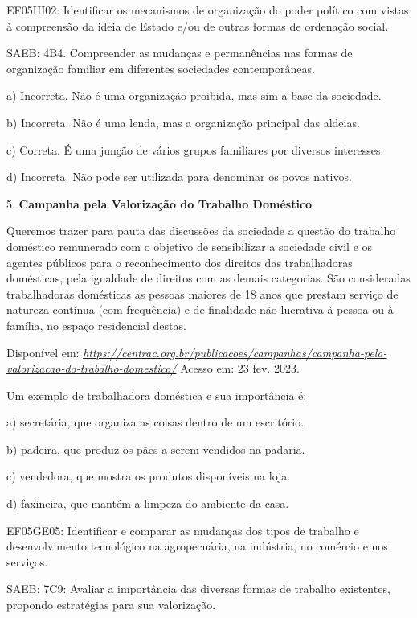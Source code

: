 EF05HI02: Identificar os mecanismos de organização do poder político com
vistas à compreensão da ideia de Estado e/ou de outras formas de
ordenação social.

SAEB: 4B4. Compreender as mudanças e permanências nas formas de
organização familiar em diferentes sociedades contemporâneas.

a) Incorreta. Não é uma organização proibida, mas sim a base da
sociedade.

b) Incorreta. Não é uma lenda, mas a organização principal das aldeias.

c) Correta. É uma junção de vários grupos familiares por diversos
interesses.

d) Incorreta. Não pode ser utilizada para denominar os povos nativos.

5. \textbf{Campanha pela Valorização do Trabalho Doméstico}

Queremos trazer para pauta das discussões da sociedade a questão do
trabalho doméstico remunerado com o objetivo de sensibilizar a sociedade
civil e os agentes públicos para o reconhecimento dos direitos das
trabalhadoras domésticas, pela igualdade de direitos com as demais
categorias. São consideradas trabalhadoras domésticas as pessoas maiores
de 18 anos que prestam serviço de natureza contínua (com frequência) e
de finalidade não lucrativa à pessoa ou à família, no espaço residencial
destas.

Disponível em:
\href{https://centrac.org.br/publicacoes/campanhas/campanha-pela-valorizacao-do-trabalho-domestico/}{\emph{https://centrac.org.br/publicacoes/campanhas/campanha-pela-valorizacao-do-trabalho-domestico/}}
Acesso em: 23 fev. 2023.

Um exemplo de trabalhadora doméstica e sua importância é:

a) secretária, que organiza as coisas dentro de um escritório.

b) padeira, que produz os pães a serem vendidos na padaria.

c) vendedora, que mostra os produtos disponíveis na loja.

d) faxineira, que mantém a limpeza do ambiente da casa.

EF05GE05: Identificar e comparar as mudanças dos tipos de trabalho e
desenvolvimento tecnológico na agropecuária, na indústria, no comércio e
nos serviços.

SAEB: 7C9: Avaliar a importância das diversas formas de trabalho
existentes, propondo estratégias para sua valorização.

